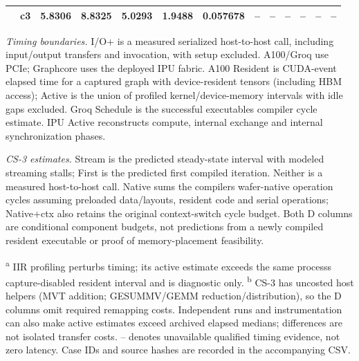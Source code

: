 \begin{table}[t]
{\begin{tabular*}{\textwidth}{@{\extracolsep{\fill}}llrrrrrrrrrrr@{}}
     & c3 & 5.8306 & 8.8325 & 5.0293 & 1.9488 & 0.057678 & -- & -- & -- & -- & -- & -- \\
    \bottomrule
  \end{tabular*}
  \par\vspace{3pt}
  \begin{minipage}{\textwidth}\fontsize{7}{8.4}\selectfont
  \textit{Timing boundaries.} I/O+ is a measured serialized host-to-host call, including input/output transfers and invocation, with setup excluded. A100/Groq use PCIe; Graphcore uses the deployed IPU fabric. A100 Resident is CUDA-event elapsed time for a captured graph with device-resident tensors (including HBM access); Active is the union of profiled kernel/device-memory intervals with idle gaps excluded. Groq Schedule is the successful executable\textquotesingle s compiler cycle estimate. IPU Active reconstructs compute, internal exchange and internal synchronization phases.
  \par\smallskip
  \textit{CS-3 estimates.} Stream is the predicted steady-state interval with modeled streaming stalls; First is the predicted first compiled iteration. Neither is a measured host-to-host call. Native sums the compiler\textquotesingle s wafer-native operation cycles assuming preloaded data/layouts, resident code and serial operations; Native+ctx also retains the original context-switch cycle budget. Both D columns are conditional component budgets, not predictions from a newly compiled resident executable or proof of memory-placement feasibility.
  \par\smallskip
  \textsuperscript{a} IIR profiling perturbs timing; its active estimate exceeds the same process\textquotesingle s capture-disabled resident interval and is diagnostic only. \textsuperscript{b} CS-3 has uncosted host helpers (MVT addition; GESUMMV/GEMM reduction/distribution), so the D columns omit required remapping costs. Independent runs and instrumentation can also make active estimates exceed archived elapsed medians; differences are not isolated transfer costs. -- denotes unavailable qualified timing evidence, not zero latency. Case IDs and source hashes are recorded in the accompanying CSV.
  \end{minipage}}
\end{table}
